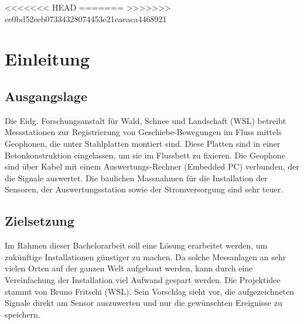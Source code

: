 %
<<<<<<< HEAD
=======
>>>>>>> ee0bd52eeb07334328074453e21eaeaca4468921
%

\chapter{Einleitung}\label{chap.einleitung}



\section{Ausgangslage}\label{sec.ausgangslage}
Die Eidg. Forschungsanstalt für Wald, Schnee und Landschaft (WSL) betreibt Messstationen zur Registrierung von Geschiebe-Bewegungen im Fluss mittels Geophonen, die unter Stahlplatten montiert sind. Diese Platten sind in einer Betonkonstruktion eingelassen, um sie im Flussbett zu fixieren. Die Geophone sind über Kabel mit einem Auswertungs-Rechner (Embedded PC) verbunden, der die Signale auswertet. Die baulichen Massnahmen für die Installation der Sensoren, der Auswertungsstation sowie der Stromversorgung sind sehr teuer. 


\section{Zielsetzung}\label{sec.zielsetzung}
Im Rahmen dieser Bachelorarbeit soll eine Lösung erarbeitet werden, um zukünftige Installationen günstiger zu machen. Da solche Messanlagen an sehr vielen Orten auf der ganzen Welt aufgebaut werden, kann durch eine Vereinfachung der Installation viel Aufwand gespart werden. Die Projektidee stammt von Bruno Fritschi (WSL). Sein Vorschlag sieht vor, die aufgezeichneten Signale direkt am Sensor auszuwerten und nur die gewünschten Ereignisse zu speichern.

